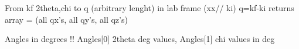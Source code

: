 \documentclass[letterpaper,10pt,english]{sphinxmanual}
\begin{document}

\begin{fulllineitems}
\label{\detokenize{Simulation_Module:LaueTools.LaueGeometry.from_twchi_to_q}}
From kf 2theta,chi to q (arbitrary lenght) in lab frame (xx// ki) q=kf-ki
returns array = (all qx’s, all qy’s, all qz’s)

Angles in degrees !!
Angles{[}0{]} 2theta deg values,
Angles{[}1{]} chi values in deg

\end{fulllineitems}

\end{document}
